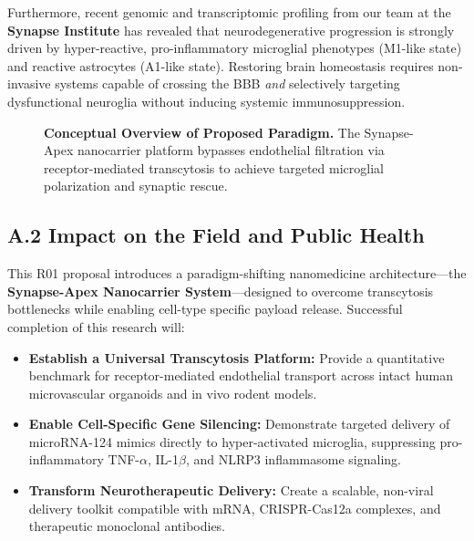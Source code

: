 \documentclass[11pt,letterpaper]{article}
\begin{document}
Furthermore, recent genomic and transcriptomic profiling from our team at the \textbf{Synapse Institute} has revealed that neurodegenerative progression is strongly driven by hyper-reactive, pro-inflammatory microglial phenotypes (M1-like state) and reactive astrocytes (A1-like state). Restoring brain homeostasis requires non-invasive systems capable of crossing the BBB \textit{and} selectively targeting dysfunctional neuroglia without inducing systemic immunosuppression.

\begin{figure}[h!]
\centering
{}
\caption{\textbf{Conceptual Overview of Proposed Paradigm.} The Synapse-Apex nanocarrier platform bypasses endothelial filtration via receptor-mediated transcytosis to achieve targeted microglial polarization and synaptic rescue.}
\end{figure}

\subsection{A.2 Impact on the Field and Public Health}
This R01 proposal introduces a paradigm-shifting nanomedicine architecture—the \textbf{Synapse-Apex Nanocarrier System}—designed to overcome transcytosis bottlenecks while enabling cell-type specific payload release. Successful completion of this research will:
\begin{itemize}
  \item \textbf{Establish a Universal Transcytosis Platform:} Provide a quantitative benchmark for receptor-mediated endothelial transport across intact human microvascular organoids and in vivo rodent models.
  \item \textbf{Enable Cell-Specific Gene Silencing:} Demonstrate targeted delivery of microRNA-124 mimics directly to hyper-activated microglia, suppressing pro-inflammatory TNF-$\alpha$, IL-1$\beta$, and NLRP3 inflammasome signaling.
  \item \textbf{Transform Neurotherapeutic Delivery:} Create a scalable, non-viral delivery toolkit compatible with mRNA, CRISPR-Cas12a complexes, and therapeutic monoclonal antibodies.
\end{itemize}
\end{document}
